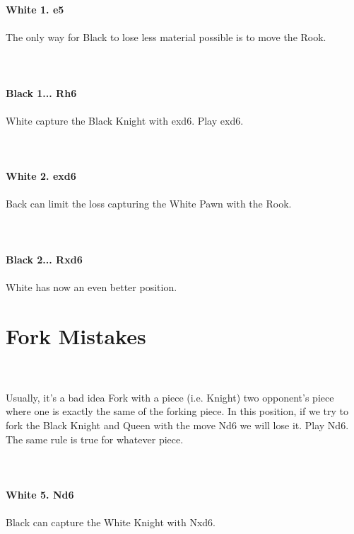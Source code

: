 \documentclass{article}
\begin{document}
\textbf{White 1. e5}\\
\\
The only way for Black to lose less material possible is to move the Rook.\\
\\

\\
\\
\textbf{Black 1... Rh6}\\
\\
White capture the Black Knight with exd6. Play exd6.\\
\\

\\
\\
\textbf{White 2. exd6}\\
\\
Back can limit the loss capturing the White Pawn with the Rook.\\
\\

\\
\\
\textbf{Black 2... Rxd6}\\
\\
White has now an even better position.\section{ Fork Mistakes}

\\
\\
Usually, it's a bad idea Fork with a piece (i.e. Knight) two opponent's piece where one is exactly the same of the forking piece. In this position, if we try to fork the Black Knight and Queen with the move Nd6 we will lose it. Play Nd6. The same rule is true for whatever piece.\\
\\

\\
\\
\textbf{White 5. Nd6}\\
\\
Black can capture the White Knight with Nxd6.\\
\\

\\
\end{document}
